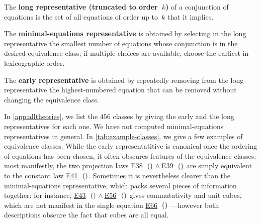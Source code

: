 \documentclass[12pt]{amsart}
\theoremstyle{plain}
\theoremstyle{definition}
\newcommand{\Equaref}[1]{\href{https://teorth.github.io/equational_theories/implications/?#1}{\textrm{\textup{E}}#1}}
\newcommand{\Equareffull}[1]{\Equaref{#1}\ifmmode\,\else\ \fi\ensuremath{(\csname Equa#1\endcsname)}}
\begin{document}
\begin{definition}\label{def:representatives}
  The \textbf{long representative (truncated to order~$k$)} of a conjunction of equations is the set of all equations of order up to~$k$ that it implies.

  The \textbf{minimal-equations representative} is obtained by selecting in the long representative the smallest number of equations whose conjunction is in the desired equivalence class; if multiple choices are available, choose the earliest in lexicographic order.

  The \textbf{early representative} is obtained by repeatedly removing from the long representative the highest-numbered equation that can be removed without changing the equivalence class.
\end{definition}

\begin{remark}
In \autoref{app:alltheories}, we list the $456$ classes by giving the early and the long representatives for each one.  We have not computed minimal-equations representatives in general.  In \autoref{tab:example-classes}, we give a few examples of equivalence classes.  While the early representatitive is canonical once the ordering of equations has been chosen, it often obscures features of the equivalence classes: most manifestly, the two projection laws \Equareffull{38}${}\wedge{}$\Equareffull{39} are simply equivalent to the constant law \Equareffull{41}.
Sometimes it is nevertheless clearer than the minimal-equations representative, which packs several pieces of information together: for instance, \Equareffull{43}${}\wedge{}$\Equareffull{56} gives commutativity and unit cubes, which are not manifest in the single equation \Equareffull{66} ---however both descriptions obscure the fact that cubes are all equal.
\end{remark}
\end{document}
